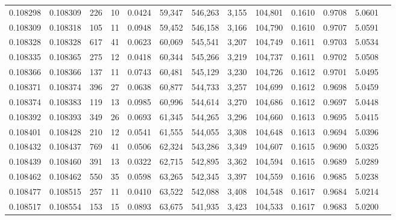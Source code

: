 \begin{tabular}{rrrrrrrrrrrrr}
0.108298 & 0.108309 &   226 &  10 &                                     0.0424 &  59,347 & 546,263 &   3,155 & 104,801 & 0.1610 & 0.9708 & 5.0601 \\
0.108309 & 0.108318 &   105 &  11 &                                     0.0948 &  59,452 & 546,158 &   3,166 & 104,790 & 0.1610 & 0.9707 & 5.0591 \\
0.108328 & 0.108328 &   617 &  41 &                                     0.0623 &  60,069 & 545,541 &   3,207 & 104,749 & 0.1611 & 0.9703 & 5.0534 \\
0.108335 & 0.108365 &   275 &  12 &                                     0.0418 &  60,344 & 545,266 &   3,219 & 104,737 & 0.1611 & 0.9702 & 5.0508 \\
0.108366 & 0.108366 &   137 &  11 &                                     0.0743 &  60,481 & 545,129 &   3,230 & 104,726 & 0.1612 & 0.9701 & 5.0495 \\
0.108371 & 0.108374 &   396 &  27 &                                     0.0638 &  60,877 & 544,733 &   3,257 & 104,699 & 0.1612 & 0.9698 & 5.0459 \\
0.108374 & 0.108383 &   119 &  13 &                                     0.0985 &  60,996 & 544,614 &   3,270 & 104,686 & 0.1612 & 0.9697 & 5.0448 \\
0.108392 & 0.108393 &   349 &  26 &                                     0.0693 &  61,345 & 544,265 &   3,296 & 104,660 & 0.1613 & 0.9695 & 5.0415 \\
0.108401 & 0.108428 &   210 &  12 &                                     0.0541 &  61,555 & 544,055 &   3,308 & 104,648 & 0.1613 & 0.9694 & 5.0396 \\
0.108432 & 0.108437 &   769 &  41 &                                     0.0506 &  62,324 & 543,286 &   3,349 & 104,607 & 0.1615 & 0.9690 & 5.0325 \\
0.108439 & 0.108460 &   391 &  13 &                                     0.0322 &  62,715 & 542,895 &   3,362 & 104,594 & 0.1615 & 0.9689 & 5.0289 \\
0.108462 & 0.108462 &   550 &  35 &                                     0.0598 &  63,265 & 542,345 &   3,397 & 104,559 & 0.1616 & 0.9685 & 5.0238 \\
0.108477 & 0.108515 &   257 &  11 &                                     0.0410 &  63,522 & 542,088 &   3,408 & 104,548 & 0.1617 & 0.9684 & 5.0214 \\
0.108517 & 0.108554 &   153 &  15 &                                     0.0893 &  63,675 & 541,935 &   3,423 & 104,533 & 0.1617 & 0.9683 & 5.0200 \\

\end{tabular}
